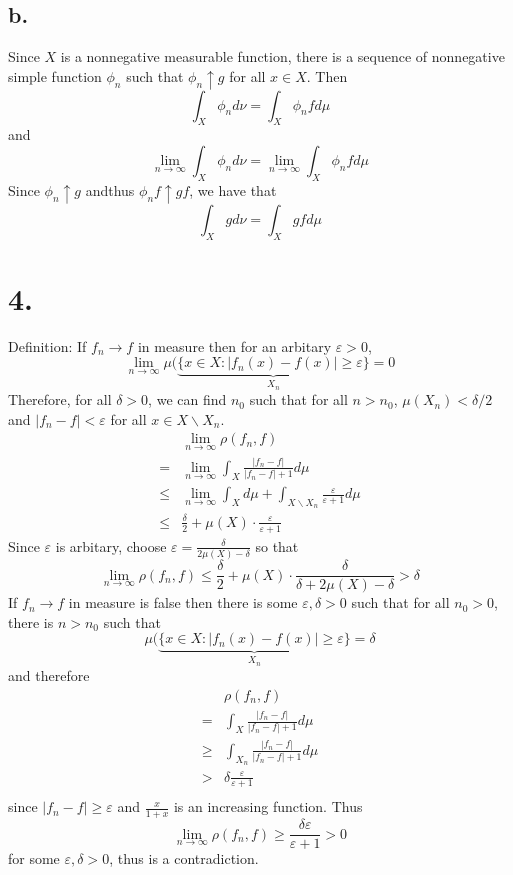 \documentclass[11pt]{article}
\theoremstyle{mystyle}
\theoremstyle{definition}
\begin{document}
\subsection*{b.}
Since $X$ is a nonnegative measurable function, there is a sequence of nonnegative simple function $\phi_n$ such that $\phi_n \uparrow g$ for all $x \in X$. Then 
\[
  \int_X \phi_n d\nu = \int_X \phi_n f d\mu
\]
and 
\[
  \lim_{n \to \infty} \int_X \phi_n d\nu = \lim_{n \to \infty} \int_X \phi_n f d\mu
\]
Since $\phi_n \uparrow g$ andthus $\phi_n f \uparrow gf$, we have that 
\[
  \int_X g d\nu = \int_X gf d\mu
\]
\newpage
\section*{4.}
Definition: If $f_n \to f$ in measure then for an arbitary $\varepsilon > 0$,  
\[
  \lim_{n \to \infty} \mu(\underbrace{\{x \in X: |f_n(x) - f(x)| \ge \varepsilon\}}_{X_n} = 0
\]
Therefore, for all $\delta > 0$, we can find $n_0$ such that for all $n>n_0$, $\mu(X_n) < \delta/2$ and $|f_n-f| < \varepsilon$ for all $x \in X \backslash X_n$.  
\begin{align*} 
  &\lim_{n \to \infty} \rho(f_n, f) \\ 
  =& \lim_{n \to \infty} \int_X \displaystyle\frac{|f_n-f|}{|f_n - f| + 1} d\mu \\
  \le& \lim_{n \to \infty} \int_X d\mu + \int_{X\backslash X_n} \displaystyle\frac{\varepsilon}{\varepsilon + 1} d\mu \\
  \le& \displaystyle\frac{\delta}{2} + \mu(X) \cdot \displaystyle\frac{\varepsilon}{\varepsilon + 1}  
\end{align*}
Since $\varepsilon$ is arbitary, choose $\varepsilon = \displaystyle\frac{\delta}{2\mu(X)-\delta}$ so that 
\[
  \lim_{n \to \infty} \rho(f_n, f) \le \displaystyle\frac{\delta}{2} + \mu(X) \cdot \displaystyle\frac{\delta}{\delta + 2\mu(X) - \delta} > \delta
\]
If $f_n \to f$ in measure is false then there is some $\varepsilon, \delta > 0$ such that for all $n_0 > 0$, there is $n> n_0$ such that 
\[ 
  \mu(\underbrace{\{x \in X: |f_n(x) - f(x)| \ge \varepsilon\}}_{X_n} = \delta
\]
and therefore
\begin{align*}
  &\rho(f_n, f) \\
  =& \int_X \displaystyle\frac{|f_n-f|}{|f_n - f| + 1} d\mu \\
  \ge& \int_{X_n} \displaystyle\frac{|f_n-f|}{|f_n-f|+ 1} d\mu \\
  > & \delta \displaystyle\frac{\varepsilon}{\varepsilon + 1} \\
\end{align*} 
since $|f_n - f| \ge \varepsilon$ and $\displaystyle\frac{x}{1+x}$ is an increasing function. Thus 
\[
  \lim_{n \to \infty} \rho(f_n, f) \ge \displaystyle\frac{\delta \varepsilon}{\varepsilon+1} > 0
\]
for some $\varepsilon, \delta > 0$, thus is a contradiction. 
\newpage
\end{document}
